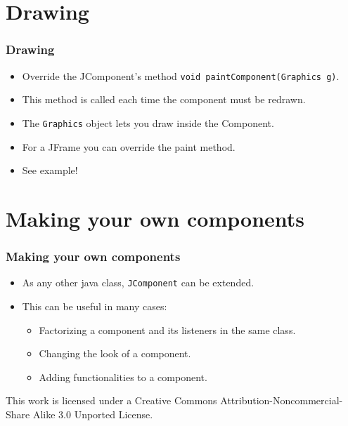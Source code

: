 \documentclass[10pt, handout]{beamer}
\begin{document}
\section{Drawing}
\begin{frame}
  \frametitle{Drawing}
  \begin{itemize}
    \item Override the JComponent's method \verb!void paintComponent(Graphics g)!.
    \item This method is called each time the component must be redrawn.
    \item The \verb!Graphics! object lets you draw inside the Component.
    \item For a JFrame you can override the paint method.
    \item See example!
  \end{itemize}
\end{frame}

\section{Making your own components}
\begin{frame}
  \frametitle{Making your own components}
  \begin{itemize}
    \item As any other java class, \verb!JComponent! can be extended.
    \item This can be useful in many cases:
      \begin{itemize}
        \item Factorizing a component and its listeners in the same class.
        \item Changing the look of a component.
        \item Adding functionalities to a component.
      \end{itemize}
  \end{itemize}
\end{frame}
\begin{frame}
\begin{center}
  \tiny
  This work is licensed under a Creative Commons Attribution-Noncommercial-Share Alike 3.0 Unported License.
\end{center}
\end{frame}
\end{document}
